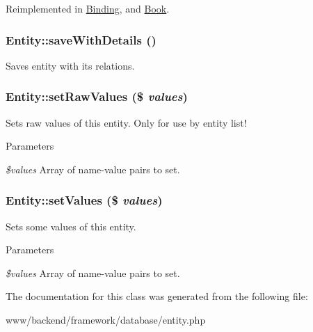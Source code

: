 Reimplemented in \hyperlink{classBinding_a7fe288b95f637d4dee16918f985df0ff}{Binding}, and \hyperlink{classBook_a746ae3bbd059bbc55d3ab6e578105ad8}{Book}.

\hypertarget{classEntity_ae8393dc2e8bc1fda9a5f47a145753b76}{
\subsubsection[{saveWithDetails}]{\setlength{\rightskip}{0pt plus 5cm}Entity::saveWithDetails ()}}
\label{classEntity_ae8393dc2e8bc1fda9a5f47a145753b76}
Saves entity with its relations. \hypertarget{classEntity_a4e945653aab38681177186fdc4787248}{
\subsubsection[{setRawValues}]{\setlength{\rightskip}{0pt plus 5cm}Entity::setRawValues (\$ {\em values})}}
\label{classEntity_a4e945653aab38681177186fdc4787248}
Sets raw values of this entity. Only for use by entity list!


\begin{DoxyParams}{Parameters}
\item[{\em \$values}]Array of name-\/value pairs to set. \end{DoxyParams}
\hypertarget{classEntity_ad346277daf8194b3c572ebdc82e435f3}{
\subsubsection[{setValues}]{\setlength{\rightskip}{0pt plus 5cm}Entity::setValues (\$ {\em values})}}
\label{classEntity_ad346277daf8194b3c572ebdc82e435f3}
Sets some values of this entity.


\begin{DoxyParams}{Parameters}
\item[{\em \$values}]Array of name-\/value pairs to set. \end{DoxyParams}


The documentation for this class was generated from the following file:\begin{DoxyCompactItemize}
\item 
www/backend/framework/database/entity.php\end{DoxyCompactItemize}
